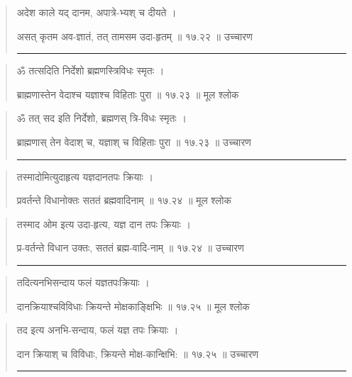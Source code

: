 \begin{quotation}

अदेश काले यद् दानम, अपात्रे-भ्यश् च दीयते ।  

असत् कृतम अव-ज्ञातं, तत् तामसम उदा-हृतम्‌  ॥ १७.२२ ॥  उच्चारण

\noindent\rule{16cm}{0.4pt} 
\end{quotation}


\begin{quotation}

ॐ तत्सदिति निर्देशो ब्रह्मणस्त्रिविधः स्मृतः ।  

ब्राह्मणास्तेन वेदाश्च यज्ञाश्च विहिताः पुरा  ॥ १७.२३ ॥  मूल श्लोक
\end{quotation}

\begin{quotation}
ॐ तत् सद इति निर्देशो, ब्रह्मणस् त्रि-विधः स्मृतः ।  

ब्राह्मणास् तेन वेदाश् च, यज्ञाश् च विहिताः पुरा  ॥ १७.२३ ॥  उच्चारण

\noindent\rule{16cm}{0.4pt} 
\end{quotation}


\begin{quotation}

तस्मादोमित्युदाहृत्य यज्ञदानतपः क्रियाः ।  

प्रवर्तन्ते विधानोक्तः सततं ब्रह्मवादिनाम्‌  ॥ १७.२४ ॥  मूल श्लोक
\end{quotation}

\begin{quotation}

तस्माद ओम इत्य उदा-हृत्य, यज्ञ दान तपः क्रियाः ।  

प्र-वर्तन्ते विधान उक्तः, सततं ब्रह्म-वादि-नाम्‌  ॥ १७.२४ ॥  उच्चारण

\noindent\rule{16cm}{0.4pt} 
\end{quotation}


\begin{quotation}

तदित्यनभिसन्दाय फलं यज्ञतपःक्रियाः ।  

दानक्रियाश्चविविधाः क्रियन्ते मोक्षकाङ्क्षिभिः  ॥ १७.२५ ॥  मूल श्लोक
\end{quotation}

\begin{quotation}

तद इत्य अनभि-सन्दाय, फलं यज्ञ तपः क्रियाः ।  

दान क्रियाश् च विविधाः, क्रियन्ते मोक्ष-कान्क्षिभि:  ॥ १७.२५ ॥  उच्चारण

\noindent\rule{16cm}{0.4pt} 
\end{quotation}


